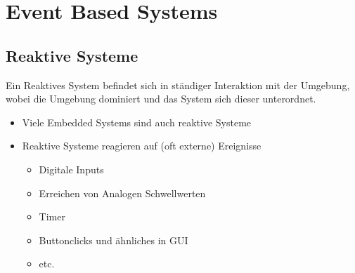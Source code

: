 \section{Event Based Systems}
\subsection{Reaktive Systeme}
Ein Reaktives System befindet sich in ständiger Interaktion mit der Umgebung, wobei die Umgebung dominiert und das System sich dieser unterordnet.
\begin{itemize}
	\item Viele Embedded Systems sind auch reaktive Systeme
	\item Reaktive Systeme reagieren auf (oft externe) Ereignisse
	\begin{itemize}
	\item Digitale Inputs
	\item Erreichen von Analogen Schwellwerten
	\item Timer
	\item Buttonclicks und ähnliches in GUI
	\item etc.
	\end{itemize}
\end{itemize}
